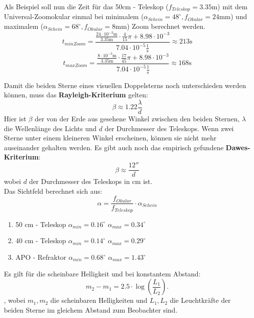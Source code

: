 Als Beispiel soll nun die Zeit für das 50cm - Teleskop ($f_{Teleskop} = 3.35\mathrm{m}$) mit dem Universal-Zoomokular einmal bei minimalem ($\alpha_{Schein}=48^{\circ}, f_{Okular} = 24 \mathrm{mm}$) und maximalem ($\alpha_{Schein}=68^{\circ}, f_{Okular} = 8 \mathrm{mm}$) Zoom berechnet werden.
\begin{equation}
t_{minZoom} = \frac{\frac{24 \cdot 10^{-3} \mathrm{m}}{3.35 \mathrm{m}}\cdot \frac{4}{15}\pi + 8.98 \cdot 10^{-3}}{7.04\cdot 10^{-5} \frac{1}{\mathrm{s}}} \approx 213 \mathrm{s}
\end{equation}
\begin{equation}
t_{maxZoom} = \frac{\frac{8 \cdot 10^{-3} \mathrm{m}}{3.35 \mathrm{m}}\cdot \frac{17}{45}\pi + 8.98 \cdot 10^{-3}}{7.04\cdot 10^{-5} \frac{1}{\mathrm{s}}} \approx 168 \mathrm{s}
\end{equation}


Damit die beiden Sterne eines visuellen Doppelsterns noch unterschieden werden können, muss das \textbf{Rayleigh-Kriterium} gelten:
\begin{equation}
\beta \approx 1.22\frac{\lambda}{d}
\end{equation}
Hier ist $\beta$ der von der Erde aus gesehene Winkel zwischen den beiden Sternen, $\lambda$ die Wellenlänge des Lichts und $d$ der Durchmesser des Teleskops. Wenn zwei Sterne unter einem kleineren Winkel erscheinen, können sie nicht mehr auseinander gehalten werden.
Es gibt auch noch das empirisch gefundene \textbf{Dawes-Kriterium}:
\begin{equation}
\beta \approx \frac{12''}{d}
\end{equation}
wobei $d$ der Durchmesser des Teleskops in cm ist.
\\
Das Sichtfeld berechnet sich aus:
\begin{equation}
\alpha = \frac{f_{Okular}}{f_{Teleskop}}\cdot \alpha_{Schein}
\end{equation}
\begin{enumerate}
\item
50 cm - Teleskop
$\alpha_{min} = 0.16^{\circ}$
$\alpha_{max} = 0.34^{\circ}$
\item
40 cm - Teleskop
$\alpha_{min} = 0.14^{\circ}$
$\alpha_{max} = 0.29^{\circ}$
\item
APO - Refraktor
$\alpha_{min} = 0.68^{\circ}$
$\alpha_{max} = 1.43^{\circ}$
\end{enumerate}




Es gilt für die scheinbare Helligkeit und bei konstantem Abstand: 
\begin{equation}
m_2 - m_1 = 2.5\cdot \log(\frac{L_1}{L_2}). 
\end{equation}, 
wobei $m_1, m_2$ die scheinbaren Helligkeiten und $L_1, L_2$  die Leuchtkräfte der beiden Sterne im gleichem Abstand zum Beobachter sind.

